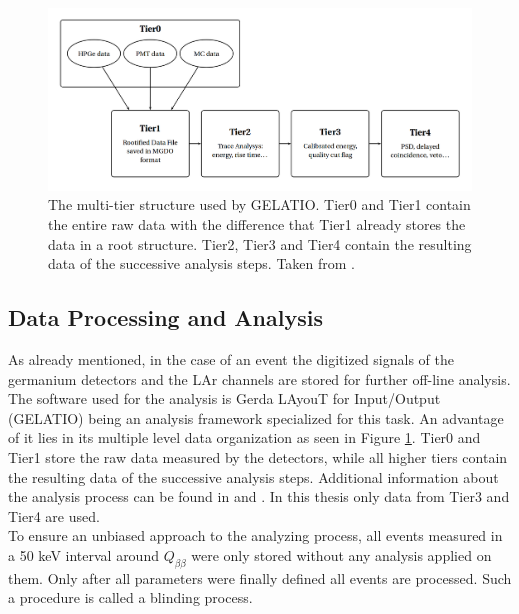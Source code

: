 \documentclass[encoding=utf8,british]{tumphthesis}
\begin{document}
\begin{figure}[t!]
	\centering
		\includegraphics[width=\textwidth]{./Bilder/TierStructure.png}
		\caption{
		The multi-tier structure used by GELATIO. 
		Tier0 and Tier1 contain the entire raw data with the difference that Tier1 already stores the data in a root structure.
		Tier2, Tier3 and Tier4 contain the resulting data of the successive analysis steps.
		Taken from \cite{agostini_gelatio:_2011}.
		}
		\label{fig:TierStructure}
\end{figure}

\subsection{Data Processing and Analysis}
\label{sec:DataProc}



As already mentioned, in the case of an event the digitized signals of the germanium detectors and the LAr channels are stored for further off-line analysis.
The software used for the analysis is Gerda LAyouT for Input/Output (GELATIO) being an analysis framework specialized for this task.
An advantage of it lies in its multiple level data organization as seen in Figure \ref{fig:TierStructure}.
Tier0 and Tier1 store the raw data measured by the detectors, while all higher tiers contain the resulting data of the successive analysis steps.
Additional information about the analysis process can be found in \cite{agostini_gelatio:_2011} and \cite{agostini_off-line_2011}.
In this thesis only data from Tier3 and Tier4 are used.
\\

To ensure an unbiased approach to the analyzing process, all events measured in a  50 keV interval around $Q_{\beta\beta}$ were only stored without any analysis applied on them.
Only after all parameters were finally defined all events are processed.
Such a procedure is called a blinding process.
\\
\end{document}
